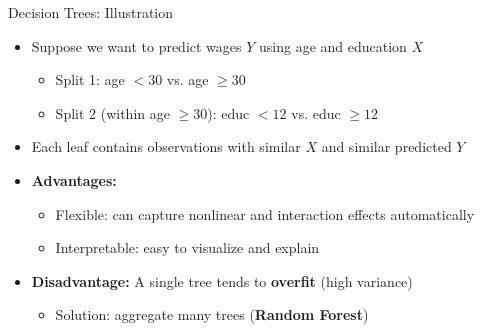 \documentclass[hyperref={pdfpagelabels=false}]{beamer}
\begin{document}
\begin{frame}{Decision Trees: Illustration}
	\begin{itemize}
		\item Suppose we want to predict wages $Y$ using age and education $X$
		\vspace{0.2cm}
		\begin{itemize}
			\item Split 1: age $< 30$ vs. age $\geq 30$
			\vspace{0.2cm}
			\item Split 2 (within age $\geq 30$): educ $< 12$ vs. educ $\geq 12$
		\end{itemize}
		\vspace{0.3cm}
		\item Each leaf contains observations with similar $X$ and similar predicted $Y$
		\vspace{0.3cm}
		\item \textbf{Advantages:}
		\vspace{0.2cm}
		\begin{itemize}
			\item Flexible: can capture nonlinear and interaction effects automatically
			\vspace{0.2cm}
			\item Interpretable: easy to visualize and explain
		\end{itemize}
		\vspace{0.3cm}
		\item \textbf{Disadvantage:} A single tree tends to \textbf{overfit} (high variance)
		\vspace{0.2cm}
		\begin{itemize}
			\item Solution: aggregate many trees (\textbf{Random Forest})
		\end{itemize}
	\end{itemize}
\end{frame}
\end{document}
